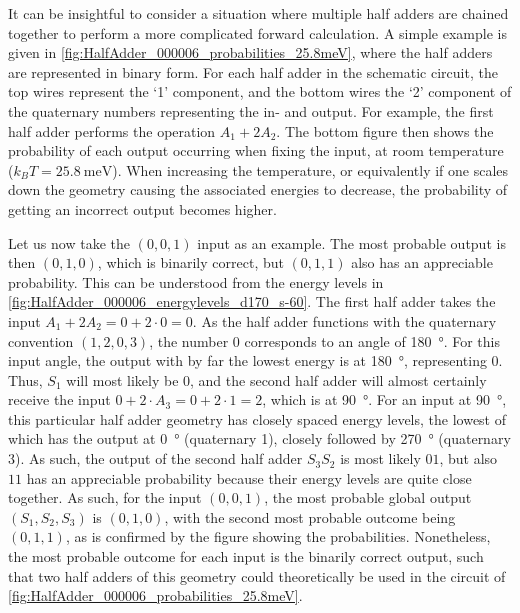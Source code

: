 \documentclass[11pt,a4paper,english]{article}
\begin{document}
It can be insightful to consider a situation where multiple half adders are chained together to perform a more complicated forward calculation. A simple example is given in \cref{fig:HalfAdder_000006_probabilities_25.8meV}, where the half adders are represented in binary form. For each half adder in the schematic circuit, the top wires represent the `1' component, and the bottom wires the `2' component of the quaternary numbers representing the in- and output. For example, the first half adder performs the operation $A_1+2A_2$. The bottom figure then shows the probability of each output occurring when fixing the input, at room temperature ($k_B T=\SI{25.8}{\milli\electronvolt}$). When increasing the temperature, or equivalently if one scales down the geometry causing the associated energies to decrease, the probability of getting an incorrect output becomes higher. \par
Let us now take the $(0,0,1)$ input as an example. The most probable output is then $(0,1,0)$, which is binarily correct, but $(0,1,1)$ also has an appreciable probability. This can be understood from the energy levels in \cref{fig:HalfAdder_000006_energylevels_d170_s-60}. The first half adder takes the input $A_1 + 2A_2 = 0+2\cdot0=0$. As the half adder functions with the quaternary convention $(1,2,0,3)$, the number 0 corresponds to an angle of \SI{180}{\degree}. For this input angle, the output with by far the lowest energy is at \SI{180}{\degree}, representing 0. Thus, $S_1$ will most likely be 0, and the second half adder will almost certainly receive the input $0+2\cdot A_3=0+2\cdot1=2$, which is at \SI{90}{\degree}. For an input at \SI{90}{\degree}, this particular half adder geometry has closely spaced energy levels, the lowest of which has the output at \SI{0}{\degree} (quaternary 1), closely followed by \SI{270}{\degree} (quaternary 3). As such, the output of the second half adder $S_3 S_2$ is most likely $01$, but also $11$ has an appreciable probability because their energy levels are quite close together. As such, for the input $(0,0,1)$, the most probable global output $(S_1, S_2, S_3)$ is $(0,1,0)$, with the second most probable outcome being $(0,1,1)$, as is confirmed by the figure showing the probabilities. Nonetheless, the most probable outcome for each input is the binarily correct output, such that two half adders of this geometry could theoretically be used in the circuit of \cref{fig:HalfAdder_000006_probabilities_25.8meV}. \par
\end{document}
